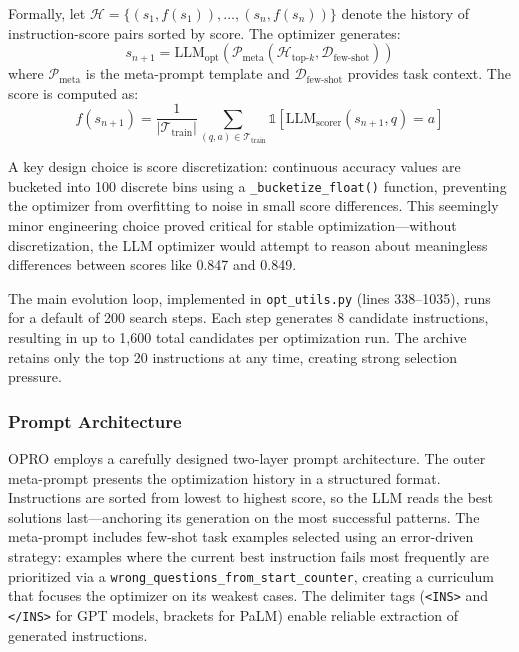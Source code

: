 Formally, let $\mathcal{H} = \{(s_1, f(s_1)), \ldots, (s_n, f(s_n))\}$ denote the history of instruction-score pairs sorted by score. The optimizer generates:
\begin{equation}
s_{n+1} = \text{LLM}_{\text{opt}}(\mathcal{P}_{\text{meta}}(\mathcal{H}_{\text{top-}k}, \mathcal{D}_{\text{few-shot}}))
\end{equation}
where $\mathcal{P}_{\text{meta}}$ is the meta-prompt template and $\mathcal{D}_{\text{few-shot}}$ provides task context. The score is computed as:
\begin{equation}
f(s_{n+1}) = \frac{1}{|\mathcal{T}_{\text{train}}|} \sum_{(q,a) \in \mathcal{T}_{\text{train}}} \mathbb{1}[\text{LLM}_{\text{scorer}}(s_{n+1}, q) = a]
\end{equation}

A key design choice is score discretization: continuous accuracy values are bucketed into 100 discrete bins using a \texttt{\_bucketize\_float()} function, preventing the optimizer from overfitting to noise in small score differences. This seemingly minor engineering choice proved critical for stable optimization---without discretization, the LLM optimizer would attempt to reason about meaningless differences between scores like 0.847 and 0.849.

The main evolution loop, implemented in \texttt{opt\_utils.py} (lines 338--1035), runs for a default of 200 search steps. Each step generates 8 candidate instructions, resulting in up to 1,600 total candidates per optimization run. The archive retains only the top 20 instructions at any time, creating strong selection pressure.

\subsubsection{Prompt Architecture}

OPRO employs a carefully designed two-layer prompt architecture. The outer meta-prompt presents the optimization history in a structured format. Instructions are sorted from lowest to highest score, so the LLM reads the best solutions last---anchoring its generation on the most successful patterns. The meta-prompt includes few-shot task examples selected using an error-driven strategy: examples where the current best instruction fails most frequently are prioritized via a \texttt{wrong\_questions\_from\_start\_counter}, creating a curriculum that focuses the optimizer on its weakest cases. The delimiter tags (\texttt{<INS>} and \texttt{</INS>} for GPT models, brackets for PaLM) enable reliable extraction of generated instructions.

